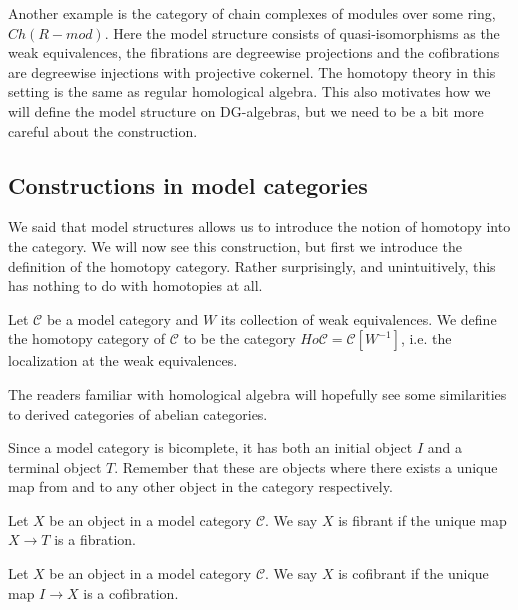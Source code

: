 \begin{example}
Another example is the category of chain complexes of modules over some ring, $Ch(R-mod)$. Here the model structure consists of quasi-isomorphisms as the weak equivalences, the fibrations are degreewise projections and the cofibrations are degreewise injections with projective cokernel. The homotopy theory in this setting is the same as regular homological algebra. This also motivates how we will define the model structure on DG-algebras, but we need to be a bit more careful about the construction. 
\end{example}



\subsection{Constructions in model categories}

We said that model structures allows us to introduce the notion of homotopy into the category. We will now see this construction, but first we introduce the definition of the homotopy category. Rather surprisingly, and unintuitively, this has nothing to do with homotopies at all. 

\begin{definition}
Let $\mathcal{C}$ be a model category and $W$ its collection of weak equivalences. We define the homotopy category of $\mathcal{C}$ to be the category $Ho\mathcal{C} = \mathcal{C}[W^{-1}]$, i.e. the localization at the weak equivalences. 
\end{definition}

\begin{remark}
The readers familiar with homological algebra will hopefully see some similarities to derived categories of abelian categories. 
\end{remark}

Since a model category is bicomplete, it has both an initial object $I$ and a terminal object $T$. Remember that these are objects where there exists a unique map from and to any other object in the category respectively. 

\begin{definition}
Let $X$ be an object in a model category $\mathcal{C}$. We say $X$ is fibrant if the unique map $X\longrightarrow T$ is a fibration. 
\end{definition}

\begin{definition}
Let $X$ be an object in a model category $\mathcal{C}$. We say $X$ is cofibrant if the unique map $I\longrightarrow X$ is a cofibration. 
\end{definition}

